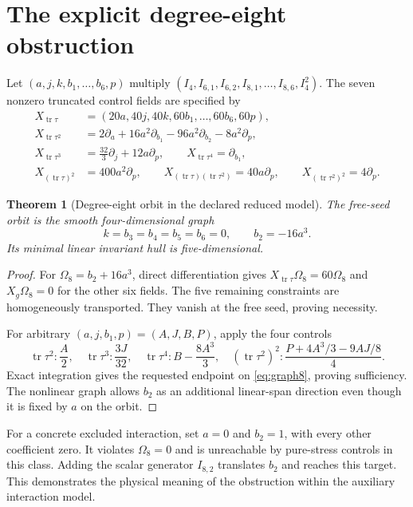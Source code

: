 \documentclass[11pt]{article}
\newtheorem{theorem}{Theorem}
\newcommand{\tr}{\operatorname{tr}}
\begin{document}
\section{The explicit degree-eight obstruction}
Let $(a,j,k,b_1,\ldots,b_6,p)$ multiply
$(I_4,I_{6,1},I_{6,2},I_{8,1},\ldots,I_{8,6},I_4^2)$.
The seven nonzero truncated control fields are specified by
\begin{align*}
 X_{\tr\tau}&=(20a,40j,40k,60b_1,\ldots,60b_6,60p),\\
 X_{\tr\tau^2}&=2\partial_a+16a^2\partial_{b_1}-96a^2\partial_{b_2}-8a^2\partial_p,\\
 X_{\tr\tau^3}&=\tfrac{32}{3}\partial_j+12a\partial_p,\qquad
 X_{\tr\tau^4}=\partial_{b_1},\\
 X_{(\tr\tau)^2}&=400a^2\partial_p,\qquad
 X_{(\tr\tau)(\tr\tau^2)}=40a\partial_p,\qquad
 X_{(\tr\tau^2)^2}=4\partial_p.
\end{align*}

\begin{theorem}[Degree-eight orbit in the declared reduced model]
The free-seed orbit is the smooth four-dimensional graph
\begin{equation}\label{eq:graph8}
 k=b_3=b_4=b_5=b_6=0,\qquad b_2=-16a^3.
\end{equation}
Its minimal linear invariant hull is five-dimensional.
\end{theorem}
\begin{proof}
For $\Omega_8=b_2+16a^3$, direct differentiation gives
$X_{\tr\tau}\Omega_8=60\Omega_8$ and $X_g\Omega_8=0$ for the other six
fields. The five remaining constraints are homogeneously transported.
They vanish at the free seed, proving necessity.

For arbitrary $(a,j,b_1,p)=(A,J,B,P)$, apply the four controls
\begin{equation}
 \tr\tau^2:\frac A2,\quad
 \tr\tau^3:\frac{3J}{32},\quad
 \tr\tau^4:B-\frac{8A^3}{3},\quad
 (\tr\tau^2)^2:\frac{P+4A^3/3-9AJ/8}{4}.
\end{equation}
Exact integration gives the requested endpoint on \eqref{eq:graph8}, proving
sufficiency. The nonlinear graph allows $b_2$ as an additional linear-span
direction even though it is fixed by $a$ on the orbit.
\end{proof}

For a concrete excluded interaction, set $a=0$ and $b_2=1$, with every other
coefficient zero. It violates $\Omega_8=0$ and is unreachable by pure-stress
controls in this class. Adding the scalar generator $I_{8,2}$ translates $b_2$
and reaches this target. This demonstrates the physical meaning of the
obstruction within the auxiliary interaction model.
\end{document}
